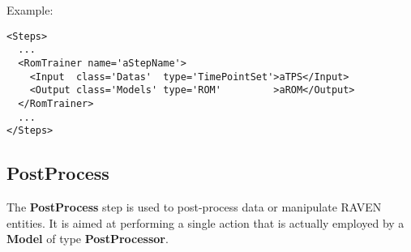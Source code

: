 Example:
\begin{lstlisting}[style=XML,morekeywords={class}]
<Steps>
  ...
  <RomTrainer name='aStepName'>
    <Input  class='Datas'  type='TimePointSet'>aTPS</Input>
    <Output class='Models' type='ROM'         >aROM</Output>
  </RomTrainer>
  ...
</Steps>
\end{lstlisting}
\subsection{PostProcess}
\label{subsec:stepPostProcess}
The \textbf{PostProcess} step is used to post-process data or manipulate RAVEN
entities.
%
It is aimed at performing a single action that is actually employed by a
\textbf{Model} of type \textbf{PostProcessor}.
%

